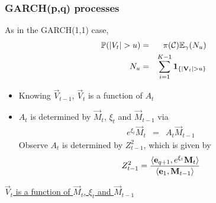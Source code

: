 \documentclass{beamer}
\begin{document}
\begin{frame}
  \frametitle{GARCH(p,q) processes}
  As in the GARCH(1,1) case,
  \begin{eqnarray*}
    \mathbb{P}(|V_t| > u) &=& \pi(\mathcal C) \mathbb{E}_\gamma(N_u) \\
    N_u &=& \sum_{i=1}^{K-1} \mathbf{1}_{\{|\mathbf{V}_t| > u\}}
  \end{eqnarray*}
  \begin{itemize}
  \item Knowing $\vec V_{t-1}$, $\vec V_t$ is a function of $A_t$
  \item $A_t$ is determined by $\vec M_t$, $\xi_t$ and $\vec M_{t-1}$ via
    \begin{eqnarray*}
      e^{\xi_t} \vec M_t &=& A_t \vec M_{t-1}
    \end{eqnarray*}
    Observe $A_t$ is determined by $Z_{t-1}^2$, which is given by
    \[
    Z_{t-1}^2 = {
      \langle\mathbf{e}_{q+1}, e^{\xi_t} \mathbf{M}_{t}\rangle
      \over
      \langle\mathbf{e}_{1}, \mathbf{M}_{t-1}\rangle
    }
    \]
  \end{itemize}
  \underline{$\vec V_t$ is a function of $\vec M_t$, $\xi_t$ and $\vec M_{t-1}$}
\end{frame}
\end{document}
